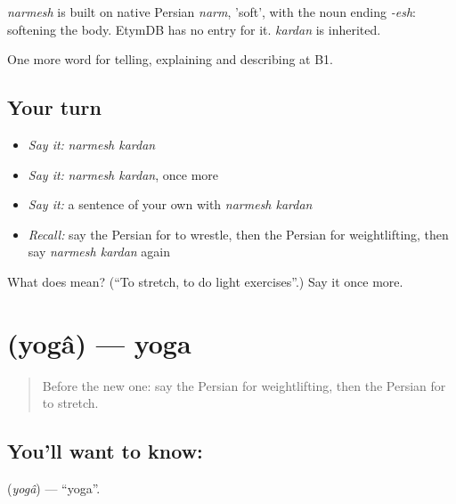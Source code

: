 \begin{cousinweb}
\emph{narmesh} is built on native Persian \emph{narm}, 'soft', with the noun ending \emph{-esh}: softening the body. EtymDB has no entry for it. \emph{kardan} is inherited.
\end{cousinweb}

\begin{grammarlens}[title={What you've built}]
One more word for telling, explaining and describing at B1.
\end{grammarlens}

\subsection*{Your turn}
\begin{itemize}
\raggedright
  \item \emph{Say it:} \emph{narmesh kardan}
  \item \emph{Say it:} \emph{narmesh kardan}, once more
  \item \emph{Say it:} a sentence of your own with \emph{narmesh kardan}
  \item \emph{Recall:} say the Persian for to wrestle, then the Persian for weightlifting, then say \emph{narmesh kardan} again
\end{itemize}

\begin{tcolorbox}[breakable,colback=teal!4,colframe=teal!35!black,title={Before you move on}]
What does   mean? (\textquotedblleft{}To stretch, to do light exercises\textquotedblright{}.) Say it once more.
\end{tcolorbox}
\section[\texorpdfstring{\fa{یوگا} (yogâ)}{یوگا (yogâ)}]{ (yogâ) — yoga}

\label{lesson:FA-C516-yoga}



\begin{quote}
Before the new one: say the Persian for weightlifting, then the Persian for to stretch.
\end{quote}

\subsection*{You'll want to know: }
\textbf{} (\emph{yogâ}) — \textquotedblleft{}yoga\textquotedblright{}.

